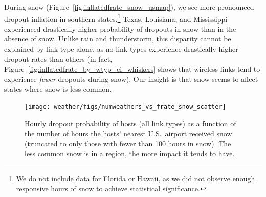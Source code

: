 During snow (Figure~\ref{fig:inflatedfrate_snow_usmap}), we see more
pronounced dropout inflation in southern states.\footnote{We do not
include data for Florida or Hawaii, as we did not
observe enough responsive hours of snow to achieve statistical
significance.}
%
Texas, Louisiana, and Mississippi experienced drastically higher
probability of dropouts in snow than in the absence of snow.
%
Unlike rain and thunderstorm, this disparity cannot be explained by
link type alone, as no link types experience drastically higher dropout
rates than others (in fact,
Figure~\ref{fig:inflatedfrate_by_wtyp_ci_whiskers} shows that wireless
links tend to experience \emph{fewer} dropouts during snow).
%
Our insight is that snow seems to affect states where snow is less
common.






\begin{figure}[t]
\centering
\texttt{[image: weather/figs/numweathers\_vs\_frate\_snow\_scatter]}
\caption{
\label{fig:numweathers_vs_frate_snow_scatter}
\figdone
	Hourly dropout probability of hosts (all link types) as a function
	of the number of hours the hosts' nearest U.S.~airport received
	snow (truncated to only those with fewer than 100 hours in snow).
	The less common snow is in a region, the more impact it tends to
	have.}
\end{figure}




